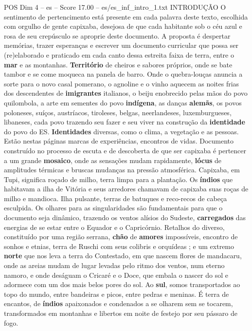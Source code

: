 \begin{textsample}{POS Dim 4 – es – Score 17.00 – es/es\_inf\_intro\_1.txt}  \label{ex:f4_pos_074}
INTRODUÇÃO O sentimento de pertencimento está presente em cada palavra deste texto, escolhida com orgulho de gente capixaba, desejosa de que cada habitante sob o céu azul e rosa de seu crepúsculo se aproprie deste documento.
A proposta é despertar memórias, trazer esperanças e escrever um documento curricular que possa ser (re)elaborado e praticado em cada canto dessa estreita faixa de terra, entre o \textbf{mar} e as montanhas. \textbf{Território} de cheiros e sabores próprios, onde se bate tambor e se come moqueca na panela de barro.
Onde o quebra-louças anuncia a sorte para o novo casal pomerano, o agnoline e o vinho aquecem as noites frias dos descendentes de \textbf{imigrantes} italianos, o beiju enobrecido pelas mãos do povo quilombola, a arte em sementes do povo \textbf{indígena}, as danças \textbf{alemãs}, os povos poloneses, suíços, austríacos, tiroleses, belgas, neerlandeses, luxemburgueses, libaneses, cada povo trazendo seu fazer e seu viver na construção da \textbf{identidade} do povo do ES. \textbf{Identidades} diversas, como o clima, a vegetação e as pessoas.
Estão nestas páginas marcas de experiências, encontros de vidas.
Documento construído no processo de escuta e de descoberta de que ser capixaba é pertencer a um grande \textbf{mosaico}, onde as sensações mudam rapidamente, \textbf{lócus} de amplitudes térmicas e bruscas mudanças na pressão atmosférica.
Capixaba, em Tupi, significa roçado de milho, terra limpa para a plantação.
Os \textbf{índios} que habitavam a ilha de Vitória e seus arredores chamavam de capixaba suas roças de milho e mandioca.
Ilha pulsante, terras de batuques e reco-recos de cabeça esculpida.
Os olhares para as singularidades são fundamentais para que o documento seja dinâmico, trazendo os ventos alísios do Sudeste, \textbf{carregados} das energias de se estar entre o Equador e o Capricórnio.
Retalhos do diverso, constituído por uma região serrana, \textbf{chão} de \textbf{amores} impossíveis, encontro de sonhos e etnias, terra de Ruschi com seus colibris e orquídeas ; e um extremo \textbf{norte} que nos leva a terra do Contestado, em que nascem flores de mandacaru, onde as areias mudam de lugar levadas pelo ritmo dos ventos, num eterno namoro, e onde deságuam o Cricaré e o Doce, que embala o nascer do sol e adormece com um dos mais belos pores do sol.
Ao \textbf{sul}, somos transportados ao topo do mundo, entre bandeiras e picos, entre pedras e meninas.
É terra de encantos, de \textbf{índios} apaixonados e condenados a se olharem sem se tocarem, transformados em montanhas e libertos em noite de festejo por seu pássaro de fogo.

\end{textsample}
